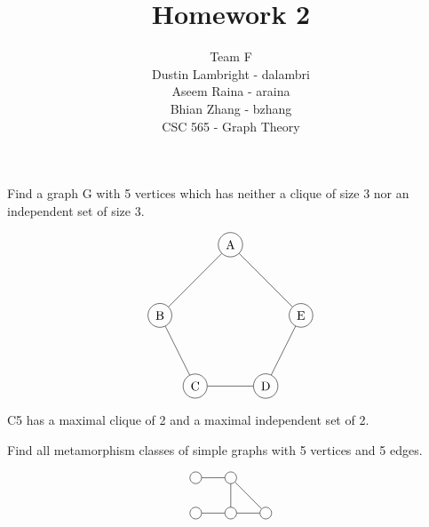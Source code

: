\documentclass[12pt]{article}
\newenvironment{question}[2][Question]{\begin{trivlist}
\item[\hskip \labelsep {\bfseries #1}\hskip \labelsep {\bfseries #2.}]}{\end{trivlist}}
\begin{document}


\title{Homework 2}%
\author{Team F \\ Dustin Lambright - dalambri \\ Aseem Raina - araina \\ Bhian Zhang - bzhang\\ %
CSC 565 - Graph Theory} %

\maketitle

\begin{question}{1}
Find a graph G with 5 vertices which has neither a clique of size 3 nor an independent set of size 3.
\end{question}

\begin{align*}
\begin{tikzpicture}
    \node[shape=circle,draw=black] (C) at (1,0) {C};
    \node[shape=circle,draw=black] (B) at (0,2) {B};
    \node[shape=circle,draw=black] (A) at (2,4) {A};
    \node[shape=circle,draw=black] (D) at (3,0) {D};
    \node[shape=circle,draw=black] (E) at (4,2) {E};
    \path [] (A) edge node[left] {} (B);
    \path [] (B) edge node[left] {} (C);
    \path [] (C) edge node[left] {} (D);
    \path [] (D) edge node[left] {} (E);
    \path [] (E) edge node[left] {} (A);
\end{tikzpicture}
\end{align*}
C5 has a maximal clique of 2 and a maximal independent set of 2.


\begin{question}{2}
	Find all metamorphism classes of simple graphs with 5 vertices and 5 edges.
\end{question}


\begin{align*}
\begin{tikzpicture}
\node[shape=circle,draw=black] (A) at (0,0) {};
\node[shape=circle,draw=black] (B) at (1,0) {};
\node[shape=circle,draw=black] (C) at (0,-1) {};
\node[shape=circle,draw=black] (D) at (1,-1) {};
\node[shape=circle,draw=black] (E) at (2,-1) {};
\path [] (A) edge node[left] {} (B);
\path [] (C) edge node[left] {} (D);
\path [] (B) edge node[left] {} (D);
\path [] (B) edge node[left] {} (E);
\path [] (D) edge node[left] {} (E);
\end{tikzpicture}
\end{align*}
\end{document}
